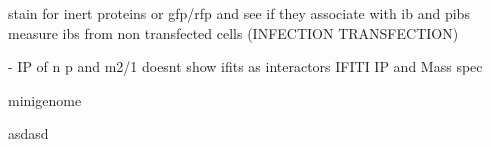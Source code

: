 stain for inert proteins or gfp/rfp and see if they associate with ib and pibs
measure ibs from non transfected cells (INFECTION TRANSFECTION)

\cite{Oliveira2013HumanCells} - IP of n p and m2/1 doesnt show ifits as interactors
IFITI IP and Mass spec

minigenome

asdasd




